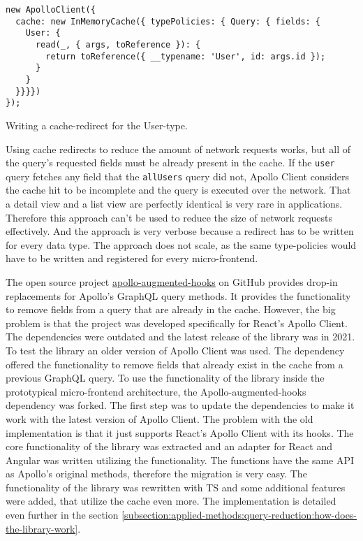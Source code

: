 \ifshowListings
\begin{listing}[H]
\begin{verbatim}
new ApolloClient({
  cache: new InMemoryCache({ typePolicies: { Query: { fields: {
    User: {
      read(_, { args, toReference }): {
        return toReference({ __typename: 'User', id: args.id });
      }
    }
  }}}})
});
\end{verbatim}
\caption{Writing a cache-redirect for the User-type.}\label{code:applied-methods:query-reduction:user-cache-redirect}
\end{listing}
\fi

\noindent Using cache redirects to reduce the amount of network requests works, but all of the query's requested fields must be already present in the cache. If the \texttt{user} query fetches any field that the \texttt{allUsers} query did not, Apollo Client considers the cache hit to be incomplete and the query is executed over the network. That a detail view and a list view are perfectly identical is very rare in applications. Therefore this approach can't be used to reduce the size of network requests effectively. And the approach is very verbose because a redirect has to be written for every data type. The approach does not scale, as the same type-policies would have to be written and registered for every micro-frontend.

\bigskip

\noindent The open source project \href{https://github.com/appmotion/apollo-augmented-hooks}{apollo-augmented-hooks} on GitHub provides drop-in replacements for Apollo's GraphQL query methods. It provides the functionality to remove fields from a query that are already in the cache. However, the big problem is that the project was developed specifically for React's Apollo Client. The dependencies were outdated and the latest release of the library was in 2021. To test the library an older version of Apollo Client was used. The dependency offered the functionality to remove fields that already exist in the cache from a previous GraphQL query. To use the functionality of the library inside the prototypical micro-frontend architecture, the Apollo-augmented-hooks dependency was forked. The first step was to update the dependencies to make it work with the latest version of Apollo Client. The problem with the old implementation is that it just supports React's Apollo Client with its hooks. The core functionality of the library was extracted and an adapter for React and Angular was written utilizing the functionality. The functions have the same \ac{API} as Apollo's original methods, therefore the migration is very easy. The functionality of the library was rewritten with \ac{TS} and some additional features were added, that utilize the cache even more. The implementation is detailed even further in the section \ref{subsection:applied-methods:query-reduction:how-does-the-library-work}.

